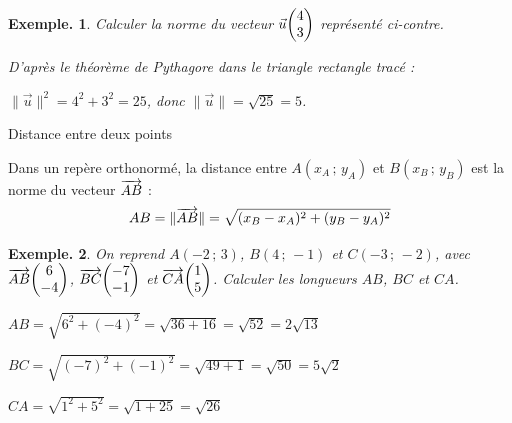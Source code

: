 \documentclass[12pt]{article}
\theoremstyle{break}
\newtheorem*{example}{Exemple.}
\begin{document}
\begin{example}
  \begin{minipage}{0.55\linewidth}
    Calculer la norme du vecteur $\vec u\col{4}{3}$ représenté ci-contre.
    \begin{reponse}
      D'après le théorème de Pythagore dans le triangle rectangle tracé :

      $\lVert \vec u \rVert^2 = 4^2 + 3^2 = 25$, donc $\lVert \vec u \rVert = \sqrt{25} = 5$.
    \end{reponse}
  \end{minipage}
  \hfill
  \begin{minipage}{0.4\linewidth}
    \begin{center}
    \end{center}
  \end{minipage}
\end{example}

\begin{proposition}{Distance entre deux points}{}
  \begin{multihide}
    Dans un repère orthonormé, la distance entre $A(x_A\,;\,y_A)$ et $B(x_B\,;\,y_B)$ est la norme du vecteur $\overrightarrow{AB}$ :
    \[
      AB = \lVert \overrightarrow{AB} \rVert = \sqrt{(x_B - x_A)^2 + (y_B - y_A)^2}
    \]
  \end{multihide}
\end{proposition}

\begin{example}
  On reprend $A(-2\,;\,3)$, $B(4\,;\,-1)$ et $C(-3\,;\,-2)$, avec $\wvec{AB}\col{6}{-4}$, $\wvec{BC}\col{-7}{-1}$ et $\wvec{CA}\col{1}{5}$. Calculer les longueurs $AB$, $BC$ et $CA$.
  \begin{reponse}
    $AB = \sqrt{6^2 + (-4)^2} = \sqrt{36 + 16} = \sqrt{52} = 2\sqrt{13}$

    $BC = \sqrt{(-7)^2 + (-1)^2} = \sqrt{49 + 1} = \sqrt{50} = 5\sqrt{2}$

    $CA = \sqrt{1^2 + 5^2} = \sqrt{1 + 25} = \sqrt{26}$
  \end{reponse}
\end{example}
\end{document}

